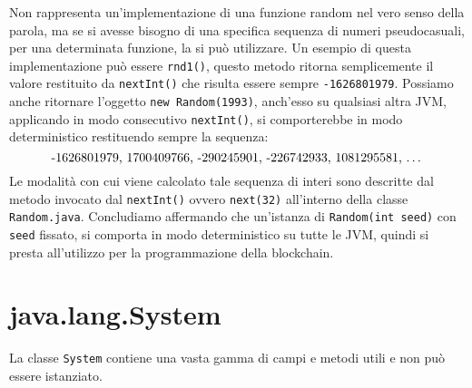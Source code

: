 		Non rappresenta un'implementazione di una funzione random nel vero senso della parola, ma se si avesse bisogno di una specifica sequenza di numeri pseudocasuali, per una determinata funzione, la si può utilizzare. Un esempio di questa implementazione può essere \lstinline|rnd1()|, questo metodo ritorna semplicemente il valore restituito da \lstinline|nextInt()| che risulta essere sempre \lstinline|-1626801979|. Possiamo anche ritornare l'oggetto \lstinline|new Random(1993)|, anch'esso su qualsiasi altra JVM, applicando in modo consecutivo \lstinline|nextInt()|, si comporterebbe in modo deterministico restituendo sempre la sequenza:
		\[ \text{-1626801979, 1700409766, -290245901, -226742933, 1081295581, \dots}\]
		Le modalità con cui viene calcolato tale sequenza di interi sono descritte dal metodo invocato dal \lstinline|nextInt()| ovvero \lstinline|next(32)| all'interno della classe \lstinline|Random.java|.
		Concludiamo affermando che un'istanza di \lstinline|Random(int seed)| con \lstinline|seed| fissato, si comporta in modo deterministico su tutte le JVM, quindi si presta all'utilizzo per la programmazione della blockchain.
		
	
	\section{java.lang.System}
		La classe \lstinline|System| contiene una vasta gamma di campi e metodi utili e non può essere istanziato.
		
